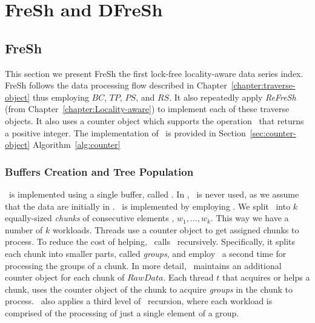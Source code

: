 \chapter{FreSh and DFreSh}
\label{chapter:FreSh}

\section{FreSh}
\label{seq:static:FreSh}

This section we present FreSh the first lock-free locality-aware data series index. 
FreSh follows the data processing flow described in Chapter~\ref{chapter:traverse-object} 
thus employing $\mathit{BC}$, $\mathit{TP}$, $\mathit{PS}$, and $\mathit{RS}$. It also
repeatedly apply \textit{ReFreSh} (from Chapter~\ref{chapter:Locality-aware}) to implement 
each of these traverse objects. It also uses a counter object which supports the operation
\NextIndex\ that returns a positive integer. The implementation of \NextIndex\ is provided
in Section~\ref{sec:counter-object} Algorithm~\ref{alg:counter}


\subsection{Buffers Creation and Tree Population} 
\label{sec:buffers_and_tree}

\BC\ is implemented using a single buffer, called \RawData.
In \BC, \Put\ is never used, as we assume that the data are initially in \RawData.
% 
\Traverse\ is implemented by employing \Refresh. 
We split \RawData\ into $k$ equally-sized {\em chunks} of consecutive 
elements , $w_1, \ldots, w_k$. This way we have a number of 
$k$ workloads. 
Threads use a counter object to get assigned chunks to process.
To reduce the cost of helping, \Fresh\ calls \Refresh\ recursively.
Specifically, it splits each chunk into smaller parts,
called {\em groups}, and employ \Refresh\ a second time for processing the groups of a chunk.
% 
In more detail, \Fresh\ maintains an additional counter object 
for each chunk of $RawData$. 
Each thread $t$ that acquires or helps a chunk, uses the counter object of the chunk to acquire
{\em groups} in the chunk to process. \Fresh\ also applies a third level of \Refresh\ recursion,
where each workload is comprised of the processing of just a single element of a group. 

